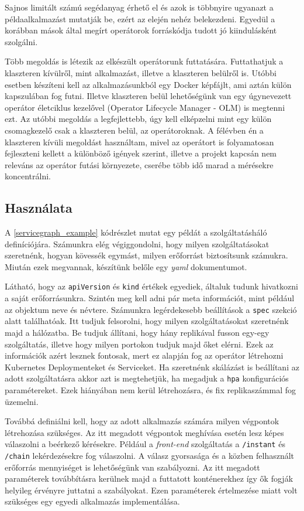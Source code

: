 Sajnos limitált számú segédanyag érhető el és azok is többnyire ugyanazt a példaalkalmazást mutatják be, ezért az elején nehéz belekezdeni.
Egyedül a korábban mások által megírt operátorok forráskódja tudott jó kiindulásként szolgálni.

Több megoldás is létezik az elkészült operátorunk futtatására.
Futtathatjuk a klaszteren kívülről, mint alkalmazást, illetve a klaszteren belülről is.
Utóbbi esetben készíteni kell az alkalmazásunkból egy Docker képfájlt, ami aztán külön kapszulában fog futni. 
Illetve klaszteren belül lehetőségünk van egy úgynevezett operátor életciklus kezelővel (Operator Lifecycle Manager - OLM) is megtenni ezt. 
Az utóbbi megoldás a legfejlettebb, úgy kell elképzelni mint egy külön csomagkezelő csak a klaszteren belül, az operátoroknak. 
A félévben én a klaszteren kívüli megoldást használtam, mivel az operátort is folyamatosan fejleszteni kellett a különböző igények szerint, illetve a projekt kapcsán nem releváns az operátor futási környezete, cserébe több idő marad a mérésekre koncentrálni.

\subsection{Használata}
A \ref{servicegraph_example} kódrészlet mutat egy példát a szolgáltatásháló definíciójára. 
Számunkra elég végiggondolni, hogy milyen szolgáltatásokat szeretnénk, hogyan kövessék egymást, milyen erőforrást biztosítsunk számukra.
Miután ezek megvannak, készítünk belőle egy \textit{yaml} dokumentumot.

Látható, hogy az \verb+apiVersion+ és \verb+kind+ értékek egyediek, általuk tudunk hivatkozni a saját erőforrásunkra.
Szintén meg kell adni pár meta információt, mint például az objektum neve és névtere.
Számunkra legérdekesebb beállítások a \verb+spec+ szekció alatt találhatóak.
Itt tudjuk felsorolni, hogy milyen szolgáltatásokat szeretnénk majd a hálózatba.
Be tudjuk állítani, hogy hány replikával fusson egy-egy szolgáltatás, illetve hogy milyen portokon tudjuk majd őket elérni. 
Ezek az információk azért lesznek fontosak, mert ez alapján fog az operátor létrehozni Kubernetes Deploymenteket és Serviceket. 
Ha szeretnénk skálázást is beállítani az adott szolgáltatásra akkor azt is megtehetjük, ha megadjuk a \verb+hpa+ konfigurációs paramétereket. 
Ezek hiányában nem kerül létrehozásra, és fix replikaszámmal fog üzemelni.

Továbbá definiálni kell, hogy az adott alkalmazás számára milyen végpontok létrehozása szükséges. 
Az itt megadott végpontok meghívása esetén lesz képes válaszolni a beérkező kérésekre.
Például a \textit{front-end} szolgáltatás a \verb+/instant+ és \verb+/chain+ lekérdezésekre fog válaszolni. 
A válasz gyorsasága és a közben felhasznált erőforrás mennyiséget is lehetőségünk van szabályozni. 
Az itt megadott paraméterek továbbításra kerülnek majd a futtatott konténerekhez így ők fogják helyileg érvényre juttatni a szabályokat. 
Ezen paraméterek értelmezése miatt volt szükséges egy egyedi alkalmazás implementálása.

